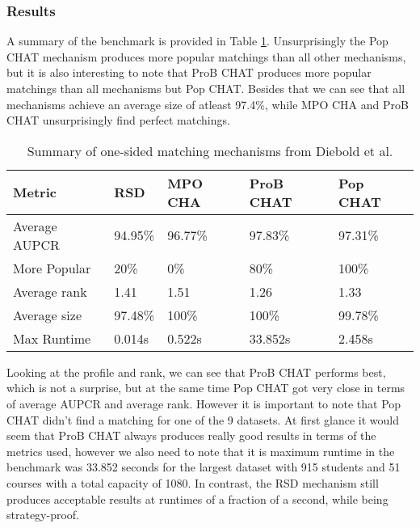 \subsubsection{Results}
A summary of the benchmark is provided in Table \ref{tab:diebold-benchmark}. Unsurprisingly the Pop CHAT mechanism produces more popular matchings than all other mechanisms, but it is also interesting to note that ProB CHAT produces more popular matchings than all mechanisms but Pop CHAT. Besides that we can see that all mechanisms achieve an average size of atleast 97.4\%, while MPO CHA and ProB CHAT unsurprisingly find perfect matchings.

\begin{table}[h!]
    \centering 
    \begin{tabular}{|l|l|l|l|l|}
        \hline
        Metric & RSD & MPO CHA & ProB CHAT & Pop CHAT \\ \hline
        Average AUPCR & 94.95\% & 96.77\% & \cellcolor[HTML]{9AFF99}97.83\% & 97.31\% \\ \hline
        More Popular & 20\% & 0\% & 80\% & \cellcolor[HTML]{9AFF99}100\% \\ \hline
        Average rank & 1.41 & 1.51 & \cellcolor[HTML]{9AFF99}1.26 & 1.33 \\ \hline
        Average size & 97.48\% & \cellcolor[HTML]{9AFF99}100\% & \cellcolor[HTML]{9AFF99}100\% & 99.78\% \\ \hline
        Max Runtime & \cellcolor[HTML]{9AFF99}0.014s & 0.522s & \cellcolor[HTML]{FFCCC9}33.852s & 2.458s \\ \hline
        \end{tabular}
    \caption{Summary of one-sided matching mechanisms from Diebold et al. \cite{DieboldBenchmark}}
    \label{tab:diebold-benchmark}
\end{table}

Looking at the profile and rank, we can see that ProB CHAT performs best, which is not a surprise, but at the same time Pop CHAT got very close in terms of average AUPCR and average rank. However it is important to note that Pop CHAT didn't find a matching for one of the 9 datasets. At first glance it would seem that ProB CHAT always produces really good results in terms of the metrics used, however we also need to note that it is maximum runtime in the benchmark was 33.852 seconds for the largest dataset with 915 students and 51 courses with a total capacity of 1080. In contrast, the RSD mechanism still produces acceptable results at runtimes of a fraction of a second, while being strategy-proof.

